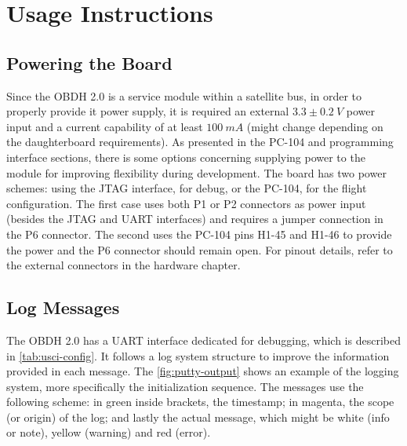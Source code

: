 %
%
%
%
%

%
%
%
%
%
%

\chapter{Usage Instructions} \label{ch:instructions}

\section{Powering the Board}

Since the OBDH 2.0 is a service module within a satellite bus, in order to properly provide it power supply, it is required an external $3.3\pm0.2\ V$ power input and a current capability of at least $100\ mA$ (might change depending on the daughterboard requirements). As presented in the PC-104 and programming interface sections, there is some options concerning supplying power to the module for improving flexibility during development. The board has two power schemes: using the JTAG interface, for debug, or the PC-104, for the flight configuration. The first case uses both P1 or P2 connectors as power input (besides the JTAG and UART interfaces) and requires a jumper connection in the P6 connector. The second uses the PC-104 pins H1-45 and H1-46 to provide the power and the P6 connector should remain open. For pinout details, refer to the external connectors in the hardware chapter.

\section{Log Messages}

The OBDH 2.0 has a UART interface dedicated for debugging, which is described in \autoref{tab:usci-config}. It follows a log system structure to improve the information provided in each message. The \autoref{fig:putty-output} shows an example of the logging system, more specifically the initialization sequence. The messages use the following scheme: in green inside brackets, the timestamp; in magenta, the scope (or origin) of the log; and lastly the actual message, which might be white (info or note), yellow (warning) and red (error).  

